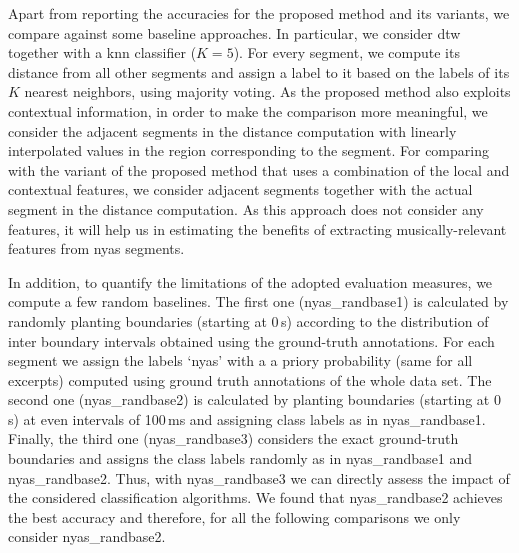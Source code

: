 {Apart from reporting the accuracies for the proposed method and its variants, we compare against some baseline approaches. In particular, we consider \gls{dtw} together with a \gls{knn} classifier ($K=5$). For every segment, we compute its distance from all other segments and assign a label to it based on the labels of its $K$ nearest neighbors, using majority voting. As the proposed method also exploits contextual information, in order to make the comparison more meaningful, we consider the adjacent segments in the distance computation with linearly interpolated values in the region corresponding to the segment. For comparing with the variant of the proposed method that uses a combination of the local and contextual features, we consider adjacent segments together with the actual segment in the distance computation. As this approach does not consider any features, it will help us in estimating the benefits of extracting musically-relevant features from \gls{nyas} segments. 

In addition, to quantify the limitations of the adopted evaluation measures, we compute a few random baselines. The first one (\acrshort{nyas_randbase1}) is calculated by randomly planting boundaries (starting at 0\,s) according to the distribution of inter boundary intervals obtained using the ground-truth annotations. For each segment we assign the labels `\gls{nyas}' with a a priory probability (same for all excerpts) computed using ground truth annotations of the whole data set. The second one (\acrshort{nyas_randbase2}) is calculated by planting boundaries (starting at 0\,s) at even intervals of 100\,ms and assigning class labels as in \acrshort{nyas_randbase1}. Finally, the third one (\acrshort{nyas_randbase3}) considers the exact ground-truth boundaries and assigns the class labels randomly as in \acrshort{nyas_randbase1} and \acrshort{nyas_randbase2}. Thus, with \acrshort{nyas_randbase3} we can directly assess the impact of the considered classification algorithms. We found that \acrshort{nyas_randbase2} achieves the best accuracy and therefore, for all the following comparisons we only consider \acrshort{nyas_randbase2}.

%

}
